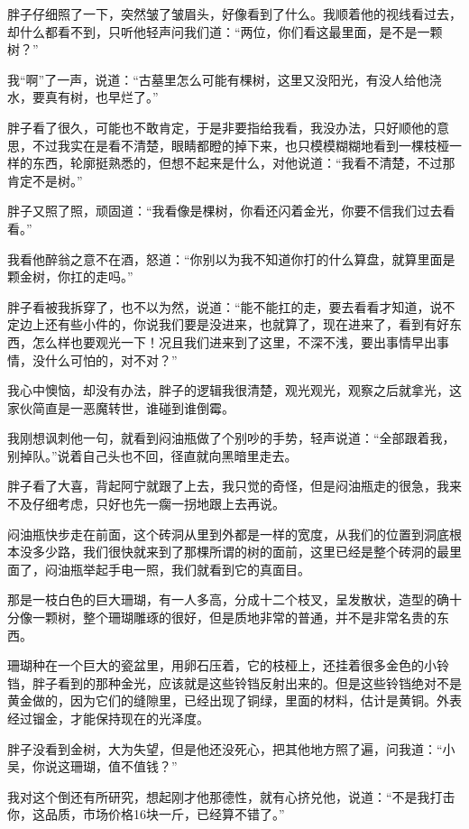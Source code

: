 胖子仔细照了一下，突然皱了皱眉头，好像看到了什么。我顺着他的视线看过去，却什么都看不到，只听他轻声问我们道：“两位，你们看这最里面，是不是一颗树？”

我“啊”了一声，说道：“古墓里怎么可能有棵树，这里又没阳光，有没人给他浇水，要真有树，也早烂了。”

胖子看了很久，可能也不敢肯定，于是非要指给我看，我没办法，只好顺他的意思，不过我实在是看不清楚，眼睛都瞪的掉下来，也只模模糊糊地看到一棵枝桠一样的东西，轮廓挺熟悉的，但想不起来是什么，对他说道：“我看不清楚，不过那肯定不是树。”

胖子又照了照，顽固道：“我看像是棵树，你看还闪着金光，你要不信我们过去看看。”

我看他醉翁之意不在酒，怒道：“你别以为我不知道你打的什么算盘，就算里面是颗金树，你扛的走吗。”

胖子看被我拆穿了，也不以为然，说道：“能不能扛的走，要去看看才知道，说不定边上还有些小件的，你说我们要是没进来，也就算了，现在进来了，看到有好东西，怎么样也要观光一下！况且我们进来到了这里，不深不浅，要出事情早出事情，没什么可怕的，对不对？”

我心中懊恼，却没有办法，胖子的逻辑我很清楚，观光观光，观察之后就拿光，这家伙简直是一恶魔转世，谁碰到谁倒霉。

我刚想讽刺他一句，就看到闷油瓶做了个别吵的手势，轻声说道：“全部跟着我，别掉队。”说着自己头也不回，径直就向黑暗里走去。

胖子看了大喜，背起阿宁就跟了上去，我只觉的奇怪，但是闷油瓶走的很急，我来不及仔细考虑，只好也先一瘸一拐地跟上去再说。

闷油瓶快步走在前面，这个砖洞从里到外都是一样的宽度，从我们的位置到洞底根本没多少路，我们很快就来到了那棵所谓的树的面前，这里已经是整个砖洞的最里面了，闷油瓶举起手电一照，我们就看到它的真面目。

那是一枝白色的巨大珊瑚，有一人多高，分成十二个枝叉，呈发散状，造型的确十分像一颗树，整个珊瑚雕琢的很好，但是质地非常的普通，并不是非常名贵的东西。

珊瑚种在一个巨大的瓷盆里，用卵石压着，它的枝桠上，还挂着很多金色的小铃铛，胖子看到的那种金光，应该就是这些铃铛反射出来的。但是这些铃铛绝对不是黄金做的，因为它们的缝隙里，已经出现了铜绿，里面的材料，估计是黄铜。外表经过镏金，才能保持现在的光泽度。

胖子没看到金树，大为失望，但是他还没死心，把其他地方照了遍，问我道：“小吴，你说这珊瑚，值不值钱？”

我对这个倒还有所研究，想起刚才他那德性，就有心挤兑他，说道：“不是我打击你，这品质，市场价格16块一斤，已经算不错了。”

